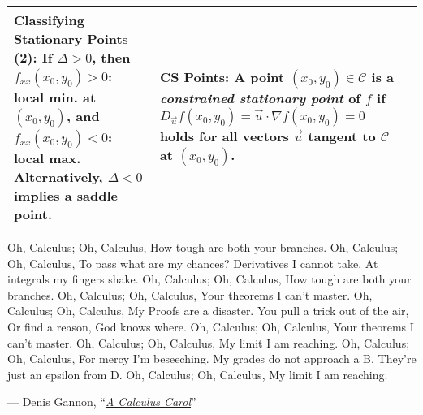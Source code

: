 \begin{tabular}{|m{.31\linewidth}|m{.31\linewidth}|m{.31\linewidth}|}
\textbf{Classifying Stationary Points (2)}:
    If
        $ \Delta > 0 $,
    then
        $ f_{xx}(x_0, y_0) > 0 $: local min. at $ (x_0, y_0) $, and
        $ f_{xx}(x_0, y_0) < 0 $: local max.
    Alternatively, $ \Delta < 0 $ implies a saddle point. &

\textbf{CS Points}:
    A point $ (x_0, y_0) \in \mathcal{C} $ is a \emph{constrained stationary
    point} of $ f $ if
        $ D_{\vec{u}}f(x_0, y_0) =
            \vec{u} \cdot \nabla f(x_0, y_0) =
            0 $
        holds for all vectors $ \vec{u} $ tangent to $ \mathcal{C} $ at
            $ (x_0, y_0) $. \\

\hline
\end{tabular}

\vfill
\begin{center}
    Oh, Calculus; Oh, Calculus,
    How tough are both your branches.
    Oh, Calculus; Oh, Calculus,
    To pass what are my chances?
    Derivatives I cannot take,
    At integrals my fingers shake.
    Oh, Calculus; Oh, Calculus,
    How tough are both your branches.
    Oh, Calculus; Oh, Calculus,
    Your theorems I can't master.
    Oh, Calculus; Oh, Calculus,
    My Proofs are a disaster.
    You pull a trick out of the air,
    Or find a reason, God knows where.
    Oh, Calculus; Oh, Calculus,
    Your theorems I can't master.
    Oh, Calculus; Oh, Calculus,
    My limit I am reaching.
    Oh, Calculus; Oh, Calculus,
    For mercy I'm beseeching.
    My grades do not approach a B,
    They're just an epsilon from D.
    Oh, Calculus; Oh, Calculus,
    My limit I am reaching.
\end{center}
\begin{flushright}
    --- Denis Gannon,
        ``\href{https://web.math.utk.edu/~vasili/va/files/oh\_calculus.html/}%
        {\textit{A Calculus Carol}}''
\end{flushright}
\vspace{-1em}


